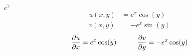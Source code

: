 \item[15.] $\overline{e^z}$
\begin{align*}
    u(x,y) &= e^x\cos(y) \\
    v(x,y) &= -e^x\sin(y)
\end{align*}
\begin{align*}
    \frac{\partial u}{\partial x}  &= e^x\cos(y)  
    &\qquad 
    \frac{\partial v}{\partial y}  &= -e^x\cos(y) \\ 
\end{align*}
